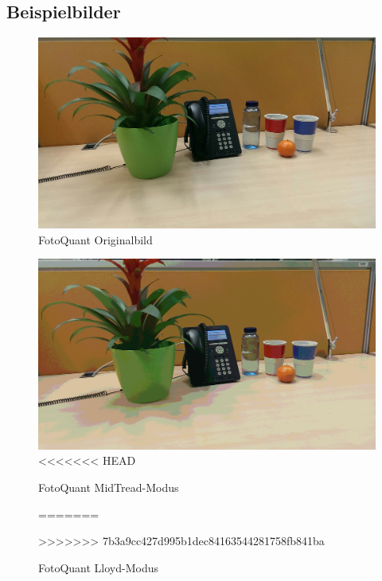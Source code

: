 \subsection{Beispielbilder}

\begin{landscape}

\begin{figure}[h]
	\centering
		\includegraphics[width=1.4\textwidth]{img/Fotos/FotoQuant_Original.jpg}
	\caption[FotoQuant Original]{FotoQuant Originalbild}
	\label{fig:quant_ori}
\end{figure}

\begin{figure}[h]
	\label{fig:quant_mid}
	\centering
		\includegraphics[width=1.4\textwidth]{img/Fotos/FotoQuant_Lloyd.jpg}
<<<<<<< HEAD
	\caption[FotoQuant MidTread]{FotoQuant MidTread-Modus}
	
=======
	\caption[FotoQuant Lloyd]{FotoQuant Lloyd-Modus}
	\label{fig:quant_lloyd}
>>>>>>> 7b3a9cc427d995b1dec84163544281758fb841ba
\end{figure}


\end{landscape}
